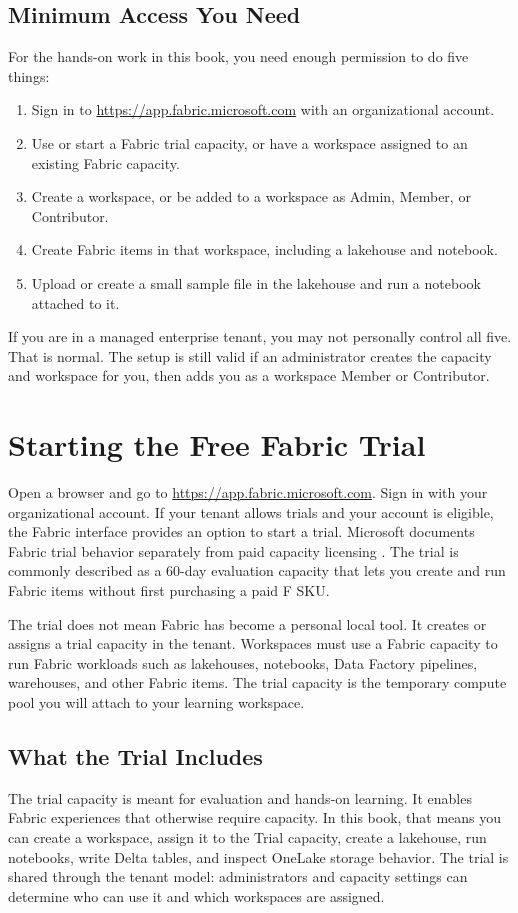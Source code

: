 \subsection{Minimum Access You Need}
For the hands-on work in this book, you need enough permission to do five things:
\begin{enumerate}
    \item Sign in to \url{https://app.fabric.microsoft.com} with an organizational account.
    \item Use or start a Fabric trial capacity, or have a workspace assigned to an existing Fabric capacity.
    \item Create a workspace, or be added to a workspace as Admin, Member, or Contributor.
    \item Create Fabric items in that workspace, including a lakehouse and notebook.
    \item Upload or create a small sample file in the lakehouse and run a notebook attached to it.
\end{enumerate}
If you are in a managed enterprise tenant, you may not personally control all five. That is normal. The setup is still valid if an administrator creates the capacity and workspace for you, then adds you as a workspace Member or Contributor.

\section{Starting the Free Fabric Trial}
Open a browser and go to \url{https://app.fabric.microsoft.com}. Sign in with your organizational account. If your tenant allows trials and your account is eligible, the Fabric interface provides an option to start a trial. Microsoft documents Fabric trial behavior separately from paid capacity licensing \cite{microsoftFabricTrial}. The trial is commonly described as a 60-day evaluation capacity that lets you create and run Fabric items without first purchasing a paid F SKU.

The trial does not mean Fabric has become a personal local tool. It creates or assigns a trial capacity in the tenant. Workspaces must use a Fabric capacity to run Fabric workloads such as lakehouses, notebooks, Data Factory pipelines, warehouses, and other Fabric items. The trial capacity is the temporary compute pool you will attach to your learning workspace.

\subsection{What the Trial Includes}
The trial capacity is meant for evaluation and hands-on learning. It enables Fabric experiences that otherwise require capacity. In this book, that means you can create a workspace, assign it to the Trial capacity, create a lakehouse, run notebooks, write Delta tables, and inspect OneLake storage behavior. The trial is shared through the tenant model: administrators and capacity settings can determine who can use it and which workspaces are assigned.

